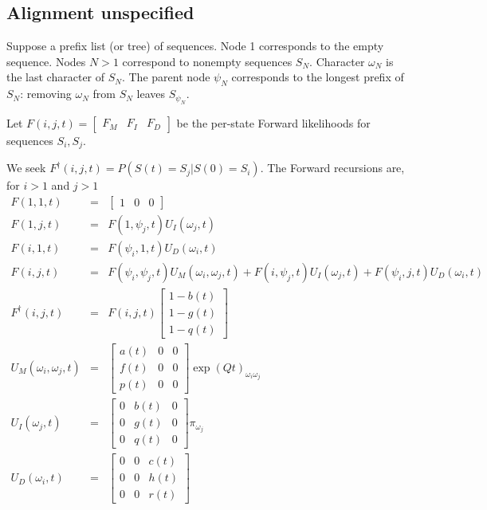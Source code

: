 \documentclass{article}
\begin{document}
\subsection{Alignment unspecified}

Suppose a prefix list (or tree) of sequences.
Node 1 corresponds to the empty sequence.
Nodes $N>1$ correspond to nonempty sequences $S_N$.
Character $\omega_N$ is the last character of $S_N$.
The parent node $\psi_N$ corresponds to the longest prefix of $S_N$:
removing $\omega_N$ from $S_N$ leaves $S_{\psi_N}$.

Let $F(i,j,t) = \begin{bmatrix} F_M & F_I & F_D \end{bmatrix}$
be the per-state Forward likelihoods for sequences $S_i,S_j$.

We seek $F^\dagger(i,j,t) = P(S(t)=S_j|S(0)=S_i)$.
The Forward recursions are, for $i>1$ and $j>1$
\begin{eqnarray*}
F(1,1,t) & = & \begin{bmatrix} 1 & 0 & 0 \end{bmatrix}
\\
F(1,j,t) & = &
F(1,\psi_j,t) U_I(\omega_j,t)
\\
F(i,1,t) & = &
F(\psi_i,1,t) U_D(\omega_i,t)
\\
F(i,j,t) & = &
F(\psi_i,\psi_j,t) U_M(\omega_i,\omega_j,t)
+ F(i,\psi_j,t) U_I(\omega_j,t)
+ F(\psi_i,j,t) U_D(\omega_i,t)
\\
F^\dagger(i,j,t) & = & F(i,j,t) \begin{bmatrix}
1-b(t) \\
1-g(t) \\
1-q(t) \end{bmatrix}
\\
U_M(\omega_i,\omega_j,t) & = &
\begin{bmatrix}
a(t) & 0 & 0 \\
f(t) & 0 & 0 \\
p(t) & 0 & 0 
\end{bmatrix}
\exp(Qt)_{\omega_i \omega_j}
\\
U_I(\omega_j,t) & = &
\begin{bmatrix}
0 & b(t) & 0 \\
0 & g(t) & 0 \\
0 & q(t) & 0 
\end{bmatrix}
\pi_{\omega_j}
\\
U_D(\omega_i,t) & = &
\begin{bmatrix}
0 & 0 & c(t) \\
0 & 0 & h(t) \\
0 & 0 & r(t) 
\end{bmatrix}
\end{eqnarray*}
\end{document}
